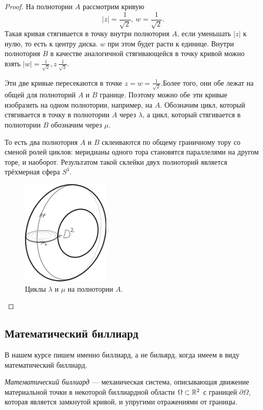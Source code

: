 \begin{proof}
    На полнотории $A$ рассмотрим кривую
    \[|z| = \frac{1}{\sqrt2}, \ w = \frac{1}{\sqrt2}.\]
    Такая кривая стягивается в точку внутри полнотория $A$, если уменьшать $|z|$ к нулю, то есть к центру диска. $w$ при этом будет расти к единице. Внутри полнотория $B$ в качестве аналогичной стягивающейся в точку кривой можно взять $|w| = \frac{1}{\sqrt2}, z \ \frac{1}{\sqrt2}$.

    Эти две кривые пересекаются в точке $z = w = \frac{1}{\sqrt2}$.Более того, они обе лежат на общей для полноторий $A$ и $B$ границе. Поэтому можно обе эти кривые изобразить на одном полнотории, например, на $A$. Обозначим цикл, который стягивается в точку в полнотории $A$ через $\lambda$, а цикл, который стягивается в полнотории $B$ обозначим через $\mu$.

    То есть два полнотория $A$ и $B$ склеиваются по общему граничному тору со сменой ролей циклов: меридианы одного тора становятся параллелями на другом торе, и наоборот. Результатом такой склейки двух полноторий является трёхмерная сфера $S^3$.

    \begin{figure}[ht]
        \centering
        \includegraphics[scale=0.8]{images/c15.8.png}
        \caption{Циклы $\lambda$ и $\mu$ на полнотории $A$.}
        \label{fig:c15.8}
    \end{figure}
\end{proof} 


\subsection{Математический биллиард}
В нашем курсе пишем именно биллиард, а не бильярд, когда имеем в виду математический биллиард.
\begin{definition}
    \textit{Математический биллиард} — механическая система, описывающая движение материальной точки в некоторой биллиардной области $\Omega \subset \mathbb{R}^2$ с границей $\partial \Omega$, которая является замкнутой кривой, и упругими отражениями от границы.
\end{definition} 

